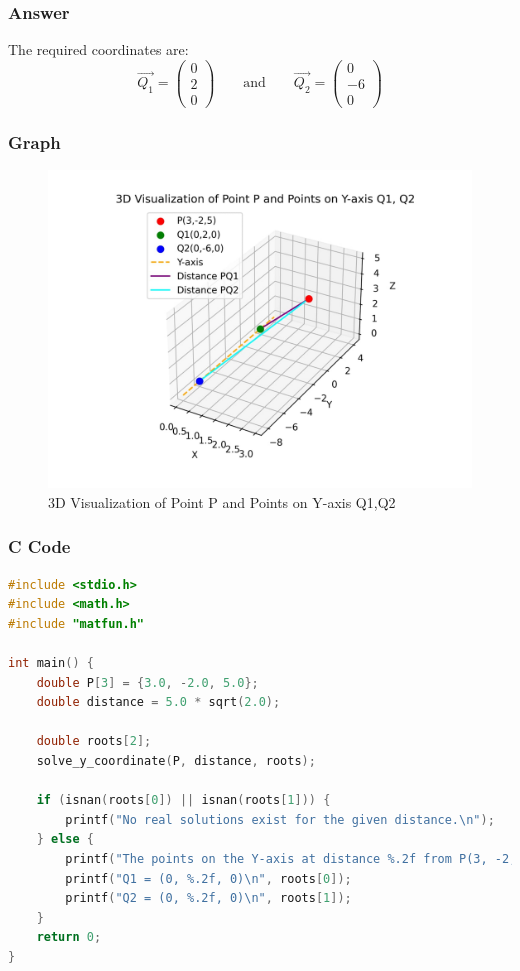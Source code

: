 \documentclass{beamer}
\theoremstyle{remark}
\newcommand{\myvec}[1]{\ensuremath{\begin{pmatrix}#1\end{pmatrix}}}
\numberwithin{equation}{section}
\numberwithin{equation}{section}
\begin{document}
\begin{frame}
\frametitle{Answer}

The required coordinates are:
\[
\vec{Q_1} = \myvec{0 \\ 2 \\ 0} \qquad \text{and} \qquad \vec{Q_2} = \myvec{0 \\ -6 \\ 0}
\]

\end{frame}
\begin{frame}
    \frametitle{Graph}
    \begin{figure}[h!]
        \centering
        \includegraphics[width=0.7\linewidth]{FIG/graph.png}
        \caption{3D Visualization of Point P and Points on Y-axis Q1,Q2}
    \end{figure}
\end{frame}
\begin{frame}[fragile]
\frametitle{C Code }
\begin{lstlisting}[language=C]
#include <stdio.h>
#include <math.h>
#include "matfun.h"

int main() {
    double P[3] = {3.0, -2.0, 5.0};
    double distance = 5.0 * sqrt(2.0);

    double roots[2];
    solve_y_coordinate(P, distance, roots);

    if (isnan(roots[0]) || isnan(roots[1])) {
        printf("No real solutions exist for the given distance.\n");
    } else {
        printf("The points on the Y-axis at distance %.2f from P(3, -2, 5) are:\n", distance);
        printf("Q1 = (0, %.2f, 0)\n", roots[0]);
        printf("Q2 = (0, %.2f, 0)\n", roots[1]);
    }
    return 0;
}

\end{lstlisting}
\end{frame}
\end{document}
